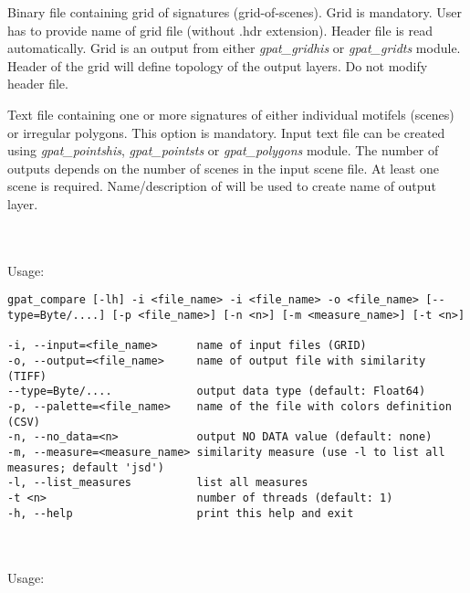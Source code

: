 
Binary file containing grid of signatures (grid-of-scenes). Grid is mandatory. User has to provide name of grid file (without .hdr extension). Header file is read automatically. Grid is an output from either {\it gpat\_gridhis} or {\it gpat\_gridts} module. Header of the grid will define topology of the output layers. Do not modify header file.


Text file containing one or more signatures of either individual motifels (scenes) or irregular polygons. This option is mandatory. Input text file can be created using {\it gpat\_pointshis}, {\it gpat\_pointsts} or {\it gpat\_polygons} module. The number of outputs depends on the number of scenes in the input scene file. At least one scene is required. Name/description of  will be used to create name of output layer. 

{}
\\\\
Usage:

\begin{minipage}{\linewidth}
\begin{lstlisting}
gpat_compare [-lh] -i <file_name> -i <file_name> -o <file_name> [--type=Byte/....] [-p <file_name>] [-n <n>] [-m <measure_name>] [-t <n>]

-i, --input=<file_name>      name of input files (GRID)
-o, --output=<file_name>     name of output file with similarity (TIFF)
--type=Byte/....             output data type (default: Float64)
-p, --palette=<file_name>    name of the file with colors definition (CSV)
-n, --no_data=<n>            output NO DATA value (default: none)
-m, --measure=<measure_name> similarity measure (use -l to list all measures; default 'jsd')
-l, --list_measures          list all measures
-t <n>                       number of threads (default: 1)
-h, --help                   print this help and exit
\end{lstlisting}
\end{minipage}

{}
\\\\
Usage:

